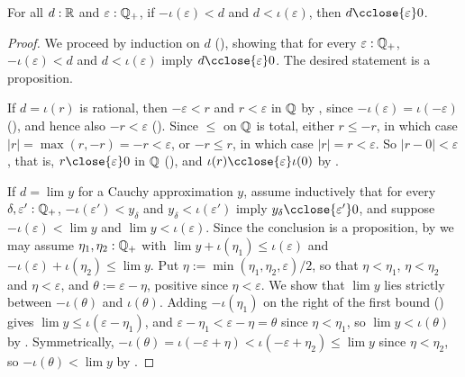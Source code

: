 \begin{lemma}
  \label{negRatLtLtRatCloseZeroReal}
  For all $d : \mathbb{R}$ and $\varepsilon : \mathbb{Q}_{+}$, if $-\iota(\varepsilon) < d$ and $d < \iota(\varepsilon)$, then $d \cclose{\varepsilon} 0$.
\end{lemma}
\begin{proof}
  We proceed by induction on $d$ (), showing that for every $\varepsilon : \mathbb{Q}_{+}$, $-\iota(\varepsilon) < d$ and $d < \iota(\varepsilon)$ imply $d \cclose{\varepsilon} 0$. The desired statement is a proposition.

  If $d = \iota(r)$ is rational, then $-\varepsilon < r$ and $r < \varepsilon$ in $\mathbb{Q}$ by , since $-\iota(\varepsilon) = \iota(-\varepsilon)$ (), and hence also $-r < \varepsilon$ (). Since $\le$ on $\mathbb{Q}$ is total, either $r \le -r$, in which case $\lvert r \rvert = \max(r, -r) = -r < \varepsilon$, or $-r \le r$, in which case $\lvert r \rvert = r < \varepsilon$. So $\lvert r - 0 \rvert < \varepsilon$, that is, $r \close{\varepsilon} 0$ in $\mathbb{Q}$ (), and $\iota(r) \cclose{\varepsilon} \iota(0)$ by .

  If $d = \lim y$ for a Cauchy approximation $y$, assume inductively that for every $\delta, \varepsilon' : \mathbb{Q}_{+}$, $-\iota(\varepsilon') < y_\delta$ and $y_\delta < \iota(\varepsilon')$ imply $y_\delta \cclose{\varepsilon'} 0$, and suppose $-\iota(\varepsilon) < \lim y$ and $\lim y < \iota(\varepsilon)$. Since the conclusion is a proposition, by  we may assume $\eta_1, \eta_2 : \mathbb{Q}_{+}$ with $\lim y + \iota(\eta_1) \le \iota(\varepsilon)$ and $-\iota(\varepsilon) + \iota(\eta_2) \le \lim y$. Put $\eta := \min(\eta_1, \eta_2, \varepsilon)/2$, so that $\eta < \eta_1$, $\eta < \eta_2$ and $\eta < \varepsilon$, and $\theta := \varepsilon - \eta$, positive since $\eta < \varepsilon$. We show that $\lim y$ lies strictly between $-\iota(\theta)$ and $\iota(\theta)$. Adding $-\iota(\eta_1)$ on the right of the first bound () gives $\lim y \le \iota(\varepsilon - \eta_1)$, and $\varepsilon - \eta_1 < \varepsilon - \eta = \theta$ since $\eta < \eta_1$, so $\lim y < \iota(\theta)$ by . Symmetrically, $-\iota(\theta) = \iota(-\varepsilon + \eta) < \iota(-\varepsilon + \eta_2) \le \lim y$ since $\eta < \eta_2$, so $-\iota(\theta) < \lim y$ by .


\end{proof}
